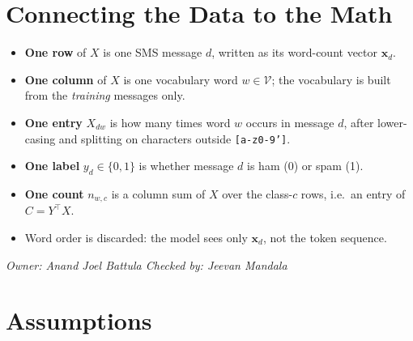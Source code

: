 \documentclass[11pt]{article}
\newcommand{\owner}[2]{\par\noindent\textit{Owner: #1 \hfill Checked by: #2}\par\medskip}
\theoremstyle{plain}
\theoremstyle{definition}
\newcommand{\V}{\mathcal{V}}
\newcommand{\bx}{\mathbf{x}}
\begin{document}
\section{Connecting the Data to the Math}\label{sec:data-math}
\begin{itemize}[leftmargin=*]
\item \textbf{One row} of $X$ is one SMS message $d$, written as its word-count vector $\bx_d$.
\item \textbf{One column} of $X$ is one vocabulary word $w\in\V$; the vocabulary is built from
the \emph{training} messages only.
\item \textbf{One entry} $X_{dw}$ is how many times word $w$ occurs in message $d$, after
lower-casing and splitting on characters outside \texttt{[a-z0-9']}.
\item \textbf{One label} $y_d\in\{0,1\}$ is whether message $d$ is ham (0) or spam (1).
\item \textbf{One count} $n_{w,c}$ is a column sum of $X$ over the class-$c$ rows, i.e.\ an
entry of $C=Y^\top X$.
\item Word order is discarded: the model sees only $\bx_d$, not the token sequence.
\end{itemize}
\owner{Anand Joel Battula}{Jeevan Mandala}

\section{Assumptions}\label{sec:assumptions}
\end{document}
